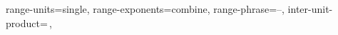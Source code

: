 

\sisetup
{
    range-units=single,
    range-exponents=combine,
    range-phrase=--,
    inter-unit-product=\,,
}

\newcommand{\effvmi}{E_v}
\newcommand{\effsvp}{E_p}
\newcommand{\efftri}{E_r}

\linespread{1.25}

\newcommand{\retag}[1]{\tag{\ref{#1} repeated}}

\newcommand{\figureretag}[1]{%
  \renewcommand{\thefigure}{\ref{#1} (repeated)}%
  \addtocounter{figure}{-1}%
}
\newcommand{\subfigureretag}[1]{%
  \renewcommand{\thesubfigure}{Figure \ref{#1} (repeated)}%
  \addtocounter{subfigure}{-1}%
}


\newtheorem{theorem}{Theorem}

\NewDocumentCommand{\anote}{}{\makebox[0pt][l]{$^*$}}

